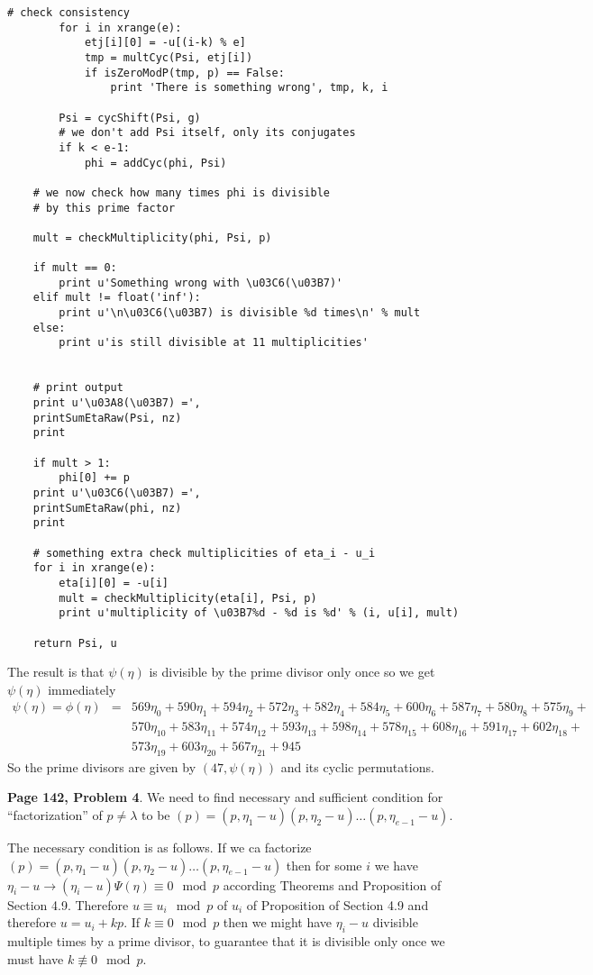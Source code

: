 \documentclass[aps,preprint,preprintnumbers,nofootinbib,showpacs,prd]{revtex4-1}
\newcommand{\nbea}{\begin{eqnarray*}}
\newcommand{\neea}{\end{eqnarray*}}
\begin{document}
\begin{Verbatim}[baselinestretch=0.75]
        # check consistency
        for i in xrange(e):
            etj[i][0] = -u[(i-k) % e]
            tmp = multCyc(Psi, etj[i])
            if isZeroModP(tmp, p) == False:
                print 'There is something wrong', tmp, k, i

        Psi = cycShift(Psi, g)
        # we don't add Psi itself, only its conjugates
        if k < e-1:
            phi = addCyc(phi, Psi)

    # we now check how many times phi is divisible
    # by this prime factor

    mult = checkMultiplicity(phi, Psi, p)
    
    if mult == 0:
        print u'Something wrong with \u03C6(\u03B7)'
    elif mult != float('inf'):
        print u'\n\u03C6(\u03B7) is divisible %d times\n' % mult
    else:
        print u'is still divisible at 11 multiplicities'
    
        
    # print output
    print u'\u03A8(\u03B7) =',
    printSumEtaRaw(Psi, nz)
    print

    if mult > 1:
        phi[0] += p
    print u'\u03C6(\u03B7) =',
    printSumEtaRaw(phi, nz)
    print

    # something extra check multiplicities of eta_i - u_i
    for i in xrange(e):
        eta[i][0] = -u[i]
        mult = checkMultiplicity(eta[i], Psi, p)
        print u'multiplicity of \u03B7%d - %d is %d' % (i, u[i], mult)
    
    return Psi, u
\end{Verbatim}
%
The result is that $\psi(\eta)$ is divisible by the prime divisor only once so we get $\psi(\eta)$ immediately
%
\nbea
\psi(\eta) = \phi(\eta) & = & 569\eta_0 + 590\eta_1 + 594\eta_2 + 572\eta_3 + 582\eta_4 + 584\eta_5 + 600\eta_6 + 587\eta_7 + 580\eta_8 + 575\eta_9 + \\
&& 570\eta_{10} + 583\eta_{11} + 574\eta_{12} + 593\eta_{13} + 598\eta_{14} + 578\eta_{15} + 608\eta_{16} + 591\eta_{17} + 602\eta_{18} + \\
&& 573\eta_{19} + 603\eta_{20} + 567\eta_{21} + 945
\neea
%
So the prime divisors are given by $(47, \psi(\eta))$ and its cyclic permutations.

{\bf Page 142, Problem 4}. We need to find necessary and sufficient condition for ``factorization'' of $p \neq \lambda$ to be $(p) = (p, \eta_1 - u)(p, \eta_2 - u) \dots (p, \eta_{e - 1} - u)$.

The necessary condition is as follows. If we ca factorize $(p) = (p, \eta_1 - u)(p, \eta_2 - u) \dots (p, \eta_{e - 1} - u)$ then for some $i$ we have $\eta_i - u \to (\eta_i - u)\Psi(\eta) \equiv 0 \mod p$ according Theorems and Proposition of Section 4.9. Therefore $u \equiv u_i \mod p$ of $u_i$ of Proposition of Section 4.9 and therefore $u = u_i + kp$. If $k \equiv 0 \mod p$ then we might have $\eta_i - u$ divisible multiple times by a prime divisor, to guarantee that it is divisible only once we must have $k \not\equiv 0 \mod p$.
\end{document}
